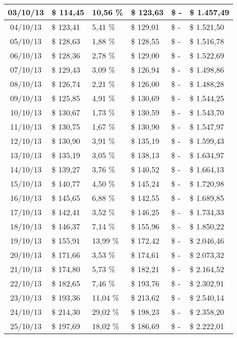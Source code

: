 \begin{small}
\begin{longtable}{|c|l|l|l|l|l|}
03/10/13 & \$ 114,45 & 10,56 \% & \$ 123,63 & \$ - & \$ 1.457,49 \\ \hline
04/10/13 & \$ 123,41 & 5,41 \% & \$ 129,01 & \$ - & \$ 1.521,50 \\ \hline
05/10/13 & \$ 128,63 & 1,88 \% & \$ 128,55 & \$ - & \$ 1.516,78 \\ \hline
06/10/13 & \$ 128,36 & 2,78 \% & \$ 129,00 & \$ - & \$ 1.522,69 \\ \hline
07/10/13 & \$ 129,43 & 3,09 \% & \$ 126,94 & \$ - & \$ 1.498,86 \\ \hline
08/10/13 & \$ 126,74 & 2,21 \% & \$ 126,00 & \$ - & \$ 1.488,28 \\ \hline
09/10/13 & \$ 125,85 & 4,91 \% & \$ 130,69 & \$ - & \$ 1.544,25 \\ \hline
10/10/13 & \$ 130,67 & 1,73 \% & \$ 130,59 & \$ - & \$ 1.543,70 \\ \hline
11/10/13 & \$ 130,75 & 1,67 \% & \$ 130,90 & \$ - & \$ 1.547,97 \\ \hline
12/10/13 & \$ 130,90 & 3,91 \% & \$ 135,19 & \$ - & \$ 1.599,43 \\ \hline
13/10/13 & \$ 135,19 & 3,05 \% & \$ 138,13 & \$ - & \$ 1.634,97 \\ \hline
14/10/13 & \$ 139,27 & 3,76 \% & \$ 140,52 & \$ - & \$ 1.664,13 \\ \hline
15/10/13 & \$ 140,77 & 4,50 \% & \$ 145,24 & \$ - & \$ 1.720,98 \\ \hline
16/10/13 & \$ 145,65 & 6,88 \% & \$ 142,55 & \$ - & \$ 1.689,85 \\ \hline
17/10/13 & \$ 142,41 & 3,52 \% & \$ 146,25 & \$ - & \$ 1.734,33 \\ \hline
18/10/13 & \$ 146,37 & 7,14 \% & \$ 155,96 & \$ - & \$ 1.850,22 \\ \hline
19/10/13 & \$ 155,91 & 13,99 \% & \$ 172,42 & \$ - & \$ 2.046,46 \\ \hline
20/10/13 & \$ 171,66 & 3,53 \% & \$ 174,61 & \$ - & \$ 2.073,32 \\ \hline
21/10/13 & \$ 174,80 & 5,73 \% & \$ 182,21 & \$ - & \$ 2.164,52 \\ \hline
22/10/13 & \$ 182,65 & 7,46 \% & \$ 193,76 & \$ - & \$ 2.302,91 \\ \hline
23/10/13 & \$ 193,36 & 11,04 \% & \$ 213,62 & \$ - & \$ 2.540,14 \\ \hline
24/10/13 & \$ 214,30 & 29,02 \% & \$ 198,23 & \$ - & \$ 2.358,20 \\ \hline
25/10/13 & \$ 197,69 & 18,02 \% & \$ 186,69 & \$ - & \$ 2.222,01 \\ \hline

\end{longtable}
\end{small}
